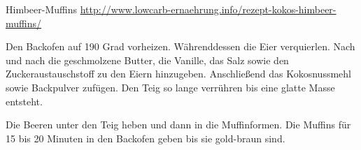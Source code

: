 \begin{recipe}[]{ Himbeer-Muffins }{\href{http://www.lowcarb-ernaehrung.info/rezept-kokos-himbeer-muffins/}{http://www.lowcarb-ernaehrung.info/rezept-kokos-himbeer-muffins/}}{ }



\step
Den Backofen auf 190 Grad vorheizen. Währenddessen die Eier verquierlen. Nach und nach die geschmolzene Butter, die Vanille, das Salz sowie den Zuckeraustauschstoff zu den Eiern hinzugeben. Anschließend das Kokosnussmehl sowie Backpulver zufügen. Den Teig so lange verrühren bis eine glatte Masse entsteht. 


\step
Die Beeren unter den Teig heben und dann in die Muffinformen. Die Muffins für 15 bis 20 Minuten in den Backofen geben bis sie gold-braun sind. 


\end{recipe}
